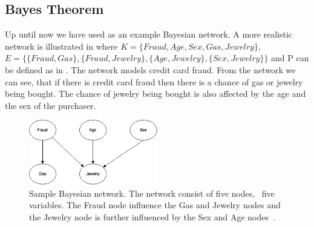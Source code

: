 \subsection{Bayes Theorem}

Up until now we have used  as an example Bayesian network. A more realistic network is illustrated in  where $K = \{Fraud, Age, Sex, Gas, Jewelry\}$, $E = \{\{Fraud, Gas\}, \{Fraud, Jewelry\}, \{Age, Jewelry\}, \{Sex, Jewelry\}\}$ and P can be defined as in . The network models credit card fraud. From the network we can see, that if there is credit card fraud then there is a chance of gas or jewelry being bought. The chance of jewelry being bought is also affected by the age and the sex of the purchaser.

\begin{figure}[h!]
\centering
\includegraphics[width=0.5\textwidth]{images/sample_bayesian_network}
\caption{Sample Bayesian network. The network consist of five nodes, \ie~five variables. The Fraud node influence the Gas and Jewelry nodes and the Jewelry node is further influenced by the Sex and Age nodes~\cite{stephenson2000introduction}.}
\label{fig:analysis:bayesian-network:sample}
\end{figure}

